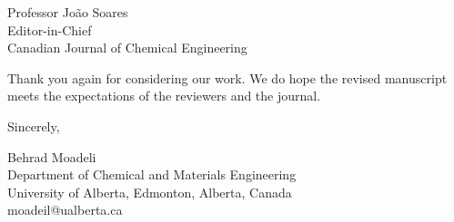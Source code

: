\documentclass[12pt]{letter}
\begin{document}
\begin{letter}{Professor João Soares \\
Editor-in-Chief \\
Canadian Journal of Chemical Engineering}

Thank you again for considering our work. We do hope the revised manuscript meets the expectations of the reviewers and the journal.

\closing{Sincerely,}

\vspace{-4em} %

Behrad Moadeli \\
Department of Chemical and Materials Engineering \\
University of Alberta, Edmonton, Alberta, Canada \\
moadeil@ualberta.ca

\end{letter}
\end{document}
